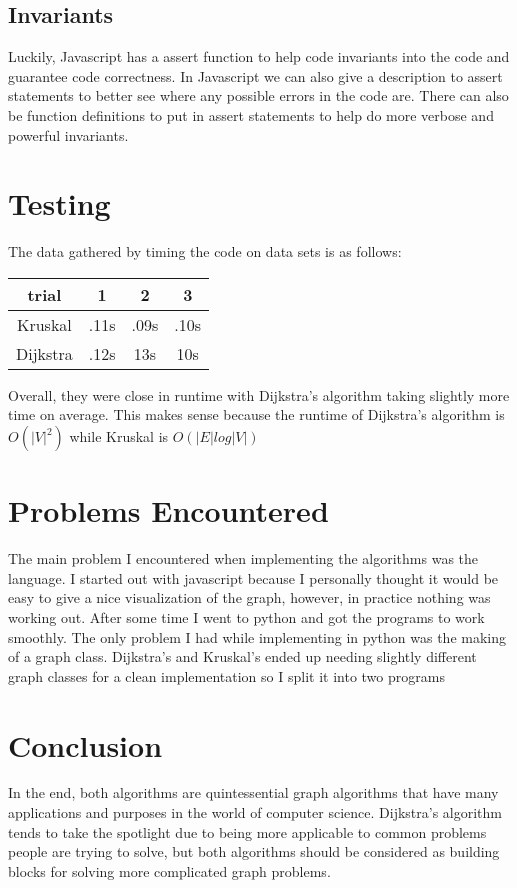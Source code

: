 \documentclass{article}
\begin{document}
\subsection{Invariants}
Luckily, Javascript has a assert function to help code invariants into the 
code and guarantee code correctness. In Javascript we can also give a 
description to assert statements to better see where any possible errors in
the code are. There can also be function definitions to put in assert statements
to help do more verbose and powerful invariants.
\section{Testing}
The data gathered by timing the code on data sets is as follows:
\begin{center}
\begin{tabular}{||c | c c c||}
	\hline
	trial & 1 & 2 & 3\\
	\hline\hline
	Kruskal&.11s&.09s&.10s\\
	\hline
	Dijkstra&.12s&13s&10s\\
	\hline
\end{tabular}
\end{center}
Overall, they were close in runtime with Dijkstra's algorithm taking slightly
more time on average. This makes sense because the runtime of Dijkstra's 
algorithm is $O(|V|^{2})$ while Kruskal is $O(|E|log|V|)$
\section{Problems Encountered}
The main problem I encountered when implementing the algorithms was the
language. I started out with javascript because I personally thought it 
would be easy to give a nice visualization of the graph, however, in 
practice nothing was working out. After some time I went to python and
got the programs to work smoothly. The only problem I had while implementing
in python was the making of a graph class. Dijkstra's and Kruskal's ended up
needing slightly different graph classes for a clean implementation so I split
it into two programs
\section{Conclusion}
In the end, both algorithms are quintessential graph algorithms that have
many applications and purposes in the world of computer science. Dijkstra's
algorithm tends to take the spotlight due to being more applicable to 
common problems people are trying to solve, but both algorithms should be
considered as building blocks for solving more complicated graph problems.
\end{document}
